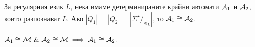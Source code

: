 \begin{framed}
  \begin{corollary}\label{cor:regular:minimal-isomorphic}
    За регулярния език $L$, нека имаме детерминираните крайни автомати $\mathcal{A}_1$ и $\mathcal{A}_2$, които разпознават $L$.
    Ако $|Q_1| = |Q_2| = |\Sigma^\star/_{\approx_L}|$, то $\mathcal{A}_1 \cong \mathcal{A}_2$.
  \end{corollary}
\end{framed}
\begin{hint}
  $\mathcal{A}_1 \cong \mathcal{M}\ \&\ \mathcal{A}_2 \cong \mathcal{M} \implies \mathcal{A}_1 \cong \mathcal{A}_2$.
\end{hint}



